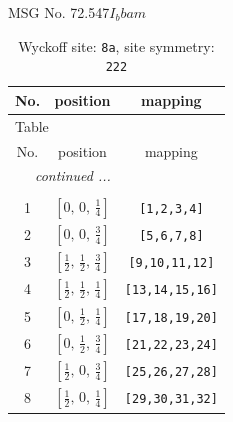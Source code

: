 \documentclass[fleqn,8pt]{jsarticle}
\begin{document}
\setcounter{MaxMatrixCols}{32}

\renewcommand{\tablename}{Table~}
\renewcommand{\figurename}{Figure~}
\begin{center}
\LARGE
MSG No. 72.547\quad$I_{b}bam$
\end{center}
\renewcommand{\arraystretch}{1.2}
\begin{longtable}{ccc}
\caption{Wyckoff site: {\tt 8a}, site symmetry: {\tt 222}}
 \\
 \hline \hline
No. & position & mapping \\ \hline \endfirsthead

\multicolumn{2}{l}{\tablename\ \thetable{}} \\
 \hline \hline
No. & position & mapping \\ \hline \endhead

 \hline \hline
\multicolumn{2}{r}{\footnotesize\it continued ...} \\ \endfoot

 \hline \hline
\multicolumn{2}{r}{} \\ \endlastfoot

1 & $\left[ 0,\, 0,\, \frac{1}{4} \right]$ & {\tt [1,2,3,4]} \\ \hline
2 & $\left[ 0,\, 0,\, \frac{3}{4} \right]$ & {\tt [5,6,7,8]} \\ \hline
3 & $\left[ \frac{1}{2},\, \frac{1}{2},\, \frac{3}{4} \right]$ & {\tt [9,10,11,12]} \\ \hline
4 & $\left[ \frac{1}{2},\, \frac{1}{2},\, \frac{1}{4} \right]$ & {\tt [13,14,15,16]} \\ \hline
5 & $\left[ 0,\, \frac{1}{2},\, \frac{1}{4} \right]$ & {\tt [17,18,19,20]} \\ \hline
6 & $\left[ 0,\, \frac{1}{2},\, \frac{3}{4} \right]$ & {\tt [21,22,23,24]} \\ \hline
7 & $\left[ \frac{1}{2},\, 0,\, \frac{3}{4} \right]$ & {\tt [25,26,27,28]} \\ \hline
8 & $\left[ \frac{1}{2},\, 0,\, \frac{1}{4} \right]$ & {\tt [29,30,31,32]} \\
\end{longtable}
\renewcommand{\arraystretch}{1.2}
\end{document}
